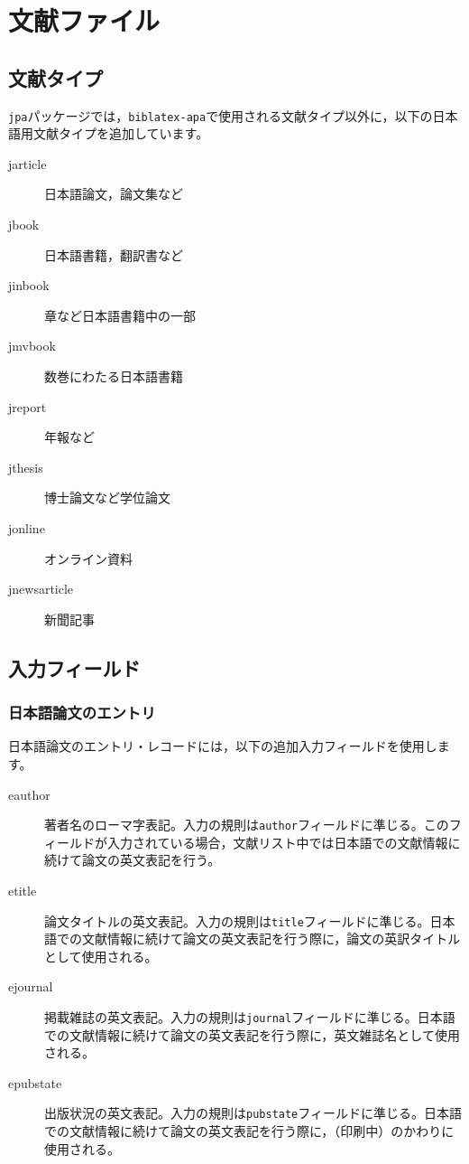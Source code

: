 \documentclass[12pt]{ltjsarticle}
\begin{document}
\section{文献ファイル}
\subsection{文献タイプ}
\texttt{jpa}パッケージでは，\texttt{biblatex-apa}で使用される文献タイプ以外に，以下の日本語用文献タイプを追加しています。
\begin{description}
  \item[jarticle]日本語論文，論文集など
  \item[jbook]日本語書籍，翻訳書など
  \item[jinbook]章など日本語書籍中の一部
  \item[jmvbook]数巻にわたる日本語書籍
  \item[jreport]年報など
  \item[jthesis]博士論文など学位論文
  \item[jonline]オンライン資料
  \item[jnewsarticle]新聞記事
\end{description}

\subsection{入力フィールド}

\subsubsection{日本語論文のエントリ}

日本語論文のエントリ・レコードには，以下の追加入力フィールドを使用します。
\begin{description}
\item[eauthor] 著者名のローマ字表記。入力の規則は\texttt{author}フィールドに準じる。このフィールドが入力されている場合，文献リスト中では日本語での文献情報に続けて論文の英文表記を行う。

\item[etitle] 論文タイトルの英文表記。入力の規則は\texttt{title}フィールドに準じる。日本語での文献情報に続けて論文の英文表記を行う際に，論文の英訳タイトルとして使用される。

\item[ejournal] 掲載雑誌の英文表記。入力の規則は\texttt{journal}フィールドに準じる。日本語での文献情報に続けて論文の英文表記を行う際に，英文雑誌名として使用される。

\item[epubstate] 出版状況の英文表記。入力の規則は\texttt{pubstate}フィールドに準じる。日本語での文献情報に続けて論文の英文表記を行う際に，（印刷中）のかわりに使用される。
\end{description}
\end{document}
